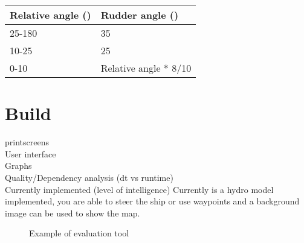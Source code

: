\begin{table}[H]
	\centering
	\begin{tabular}{l|l}
		\toprule
		Relative angle (\degree) & Rudder angle (\degree) \\
		\midrule
		25-180 & 35\\
		10-25 & 25\\
		0-10 & Relative angle $*$ 8/10 \\
		\bottomrule
	\end{tabular}
	
	\label{tab:Rudder-angle}
\end{table}

\section{Build}
printscreens\\
User interface\\
Graphs\\
Quality/Dependency analysis (dt vs runtime)\\
Currently implemented (level of intelligence)
Currently is a hydro model implemented, you are able to steer the ship or use waypoints and a background image can be used to show the map.

\begin{figure}[hb]
	\centering
	\caption{Example of evaluation tool}
	\label{fig:printscreen-tool}
\end{figure}